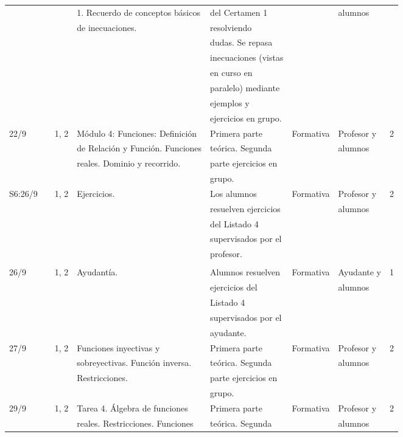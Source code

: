 \documentclass[11pt]{article}
\begin{document}
{\begin{center}
\begin{longtable}{|l|l|l|l|l|l|l|l|}
 & & & 1. Recuerdo de conceptos básicos & del Certamen 1 & & alumnos & \\
 & & & de inecuaciones. & resolviendo & & & \\
 & & & & dudas. Se repasa & & & \\
 & & & & inecuaciones (vistas & & & \\
 & & & & en curso en & & & \\
 & & & & paralelo) mediante & & & \\
 & & & & ejemplos y & & & \\
 & & & & ejercicios en grupo. & & & \\
\hline
22/9 & & 1, 2 & Módulo 4: Funciones: Definición & Primera parte & Formativa & Profesor y & 2 \\
 & & & de Relación y Función. Funciones & teórica. Segunda & & alumnos & \\
 & & & reales. Dominio y recorrido. & parte ejercicios en & & & \\
 & & & & grupo. & & & \\
\hline
S6:26/9 & & 1, 2 & Ejercicios. & Los alumnos & Formativa & Profesor y & 2 \\
 & & & & resuelven ejercicios & & alumnos & \\
 & & & & del Listado 4 & & & \\
 & & & & supervisados por el & & & \\
 & & & & profesor. & & & \\
 & & & & & & & \\
\hline
26/9 & & 1, 2 & Ayudantía. & Alumnos resuelven & Formativa & Ayudante y & 1 \\
 & & & & ejercicios del & & alumnos & \\
 & & & & Listado 4 & & & \\
 & & & & supervisados por el & & & \\
 & & & & ayudante. & & & \\
\hline
27/9 & & 1, 2 & Funciones inyectivas y & Primera parte & Formativa & Profesor y & 2 \\
 & & & sobreyectivas. Función inversa. & teórica. Segunda & & alumnos & \\
 & & & Restricciones. & parte ejercicios en & & & \\
 & & & & grupo. & & & \\
\hline
29/9 & & 1, 2 & Tarea 4. Álgebra de funciones & Primera parte & Formativa & Profesor y & 2 \\
 & & & reales. Restricciones. Funciones & teórica. Segunda & & alumnos & \\

\end{longtable}
\end{center}}
\end{document}
